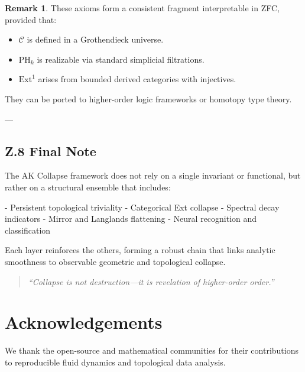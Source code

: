 \documentclass[11pt]{article}
\theoremstyle{definition}
\newtheorem{remark}[theorem]{Remark}
\begin{document}
\begin{remark}
These axioms form a consistent fragment interpretable in ZFC, provided that:
\begin{itemize}
  \item $\mathcal{C}$ is defined in a Grothendieck universe.
  \item $\mathrm{PH}_k$ is realizable via standard simplicial filtrations.
  \item $\mathrm{Ext}^1$ arises from bounded derived categories with injectives.
\end{itemize}
They can be ported to higher-order logic frameworks or homotopy type theory.
\end{remark}

---

\subsection*{Z.8 Final Note}

The AK Collapse framework does not rely on a single invariant or functional, but rather on a structural ensemble that includes:

- Persistent topological triviality
- Categorical Ext collapse
- Spectral decay indicators
- Mirror and Langlands flattening
- Neural recognition and classification

Each layer reinforces the others, forming a robust chain that links analytic smoothness to observable geometric and topological collapse.

\begin{quote}
\textit{“Collapse is not destruction—it is revelation of higher-order order.”}
\end{quote}



\section*{Acknowledgements}
We thank the open-source and mathematical communities for their contributions to reproducible fluid dynamics and topological data analysis.
\end{document}
